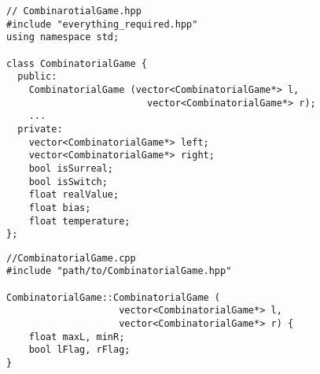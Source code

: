 \begin{lstlisting}
// CombinarotialGame.hpp
#include "everything_required.hpp"
using namespace std;

class CombinatorialGame {
  public:
	CombinatorialGame (vector<CombinatorialGame*> l,
					     vector<CombinatorialGame*> r);
	...
  private:
  	vector<CombinatorialGame*> left;
  	vector<CombinatorialGame*> right;
  	bool isSurreal;
  	bool isSwitch;
  	float realValue;
  	float bias;
  	float temperature;
};

\end{lstlisting}

\begin{lstlisting}
//CombinatorialGame.cpp
#include "path/to/CombinatorialGame.hpp"

CombinatorialGame::CombinatorialGame (
                    vector<CombinatorialGame*> l,
                    vector<CombinatorialGame*> r) {
	float maxL, minR;
	bool lFlag, rFlag;           
}
	
\end{lstlisting}